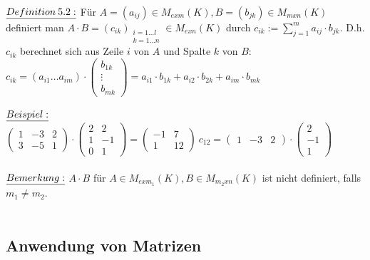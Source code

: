 \documentclass[fleqn, a4paper, 11pt]{article}
\begin{document}
\\
$\uline{Definition\:5.2:}$ F\"ur $A=(a_{ij})\in M_{exm}(K), B=(b_{jk})\in M_{mxn}(K)$ definiert man $A\cdot B=(c_{ik})_{\substack{i=1...l\\ k=1...n}}\in M_{exn}(K)$ durch $c_{ik}:=\sum\limits_{j=1}^m a_{ij}\cdot b_{jk}$. D.h. $c_{ik}$ berechnet sich aus Zeile $i$ von $A$ und Spalte $k$ von $B$: $c_{ik}=(a_{i1}\dots a_{im})\cdot\begin{pmatrix}
	b_{1k}\\
	\vdots\\
	b_{mk}
\end{pmatrix}= a_{i1}\cdot b_{1k}+ a_{i2}\cdot b_{2k}+a_{im}\cdot b_{mk}$\\
\\
$\uline{Beispiel:}$ $\begin{pmatrix}
	1 & -3 & 2\\
	3 & -5 & 1
\end{pmatrix}\cdot
\begin{pmatrix}
	2 & 2\\
	1 & -1\\
	0 & 1
\end{pmatrix}=
\begin{pmatrix}
	-1 & 7\\
	1 & 12
\end{pmatrix} \: c_{12}=
\begin{pmatrix}
	1 & -3 & 2
\end{pmatrix}\cdot
\begin{pmatrix}
	2\\
	-1\\
	1
\end{pmatrix}$\\
\\
$\uline{Bemerkung:}$ $A\cdot B$ f\"ur $A\in M_{exm_1}(K),B\in M_{m_2 xn}(K)$ ist nicht definiert, falls $m_1\neq m_2$.\\
\\
\subsection{Anwendung von Matrizen}
\end{document}

